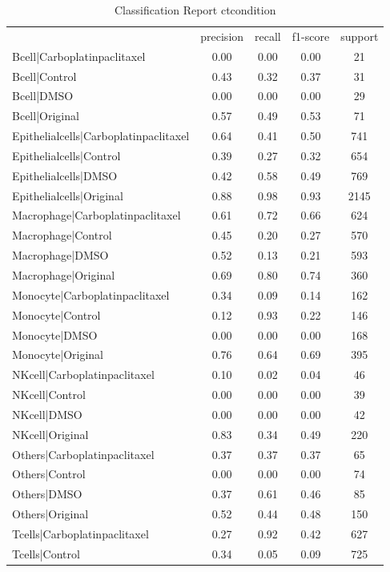 \begin{table}[htbp]
\centering
\caption{Classification Report ctcondition}
\label{tab:classificationreport.ctcondition}
\begin{tabular}{lcccc}
 & precision & recall & f1-score & support \\
Bcell|Carboplatinpaclitaxel & 0.00 & 0.00 & 0.00 & 21 \\
Bcell|Control & 0.43 & 0.32 & 0.37 & 31 \\
Bcell|DMSO & 0.00 & 0.00 & 0.00 & 29 \\
Bcell|Original & 0.57 & 0.49 & 0.53 & 71 \\
Epithelialcells|Carboplatinpaclitaxel & 0.64 & 0.41 & 0.50 & 741 \\
Epithelialcells|Control & 0.39 & 0.27 & 0.32 & 654 \\
Epithelialcells|DMSO & 0.42 & 0.58 & 0.49 & 769 \\
Epithelialcells|Original & 0.88 & 0.98 & 0.93 & 2145 \\
Macrophage|Carboplatinpaclitaxel & 0.61 & 0.72 & 0.66 & 624 \\
Macrophage|Control & 0.45 & 0.20 & 0.27 & 570 \\
Macrophage|DMSO & 0.52 & 0.13 & 0.21 & 593 \\
Macrophage|Original & 0.69 & 0.80 & 0.74 & 360 \\
Monocyte|Carboplatinpaclitaxel & 0.34 & 0.09 & 0.14 & 162 \\
Monocyte|Control & 0.12 & 0.93 & 0.22 & 146 \\
Monocyte|DMSO & 0.00 & 0.00 & 0.00 & 168 \\
Monocyte|Original & 0.76 & 0.64 & 0.69 & 395 \\
NKcell|Carboplatinpaclitaxel & 0.10 & 0.02 & 0.04 & 46 \\
NKcell|Control & 0.00 & 0.00 & 0.00 & 39 \\
NKcell|DMSO & 0.00 & 0.00 & 0.00 & 42 \\
NKcell|Original & 0.83 & 0.34 & 0.49 & 220 \\
Others|Carboplatinpaclitaxel & 0.37 & 0.37 & 0.37 & 65 \\
Others|Control & 0.00 & 0.00 & 0.00 & 74 \\
Others|DMSO & 0.37 & 0.61 & 0.46 & 85 \\
Others|Original & 0.52 & 0.44 & 0.48 & 150 \\
Tcells|Carboplatinpaclitaxel & 0.27 & 0.92 & 0.42 & 627 \\
Tcells|Control & 0.34 & 0.05 & 0.09 & 725 \\

\end{tabular}
\end{table}
